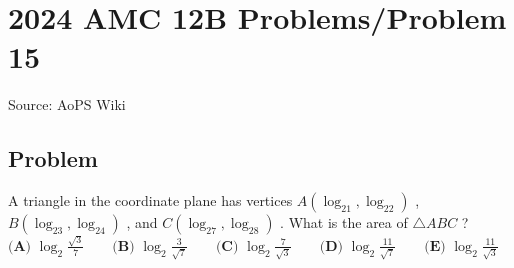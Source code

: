 \documentclass[12pt]{article}
\begin{document}
\section*{{2024 AMC 12B Problems/Problem 15}}
Source: AoPS Wiki

\subsection*{Problem}
A triangle in the coordinate plane has vertices $A(\log_21,\log_22)$ , $B(\log_23,\log_24)$ , and $C(\log_27,\log_28)$ . What is the area of $\triangle ABC$ ? $\textbf{(A) }\log_2\frac{\sqrt3}7\qquad \textbf{(B) }\log_2\frac3{\sqrt7}\qquad \textbf{(C) }\log_2\frac7{\sqrt3}\qquad \textbf{(D) }\log_2\frac{11}{\sqrt7}\qquad \textbf{(E) }\log_2\frac{11}{\sqrt3}\qquad$
\end{document}

